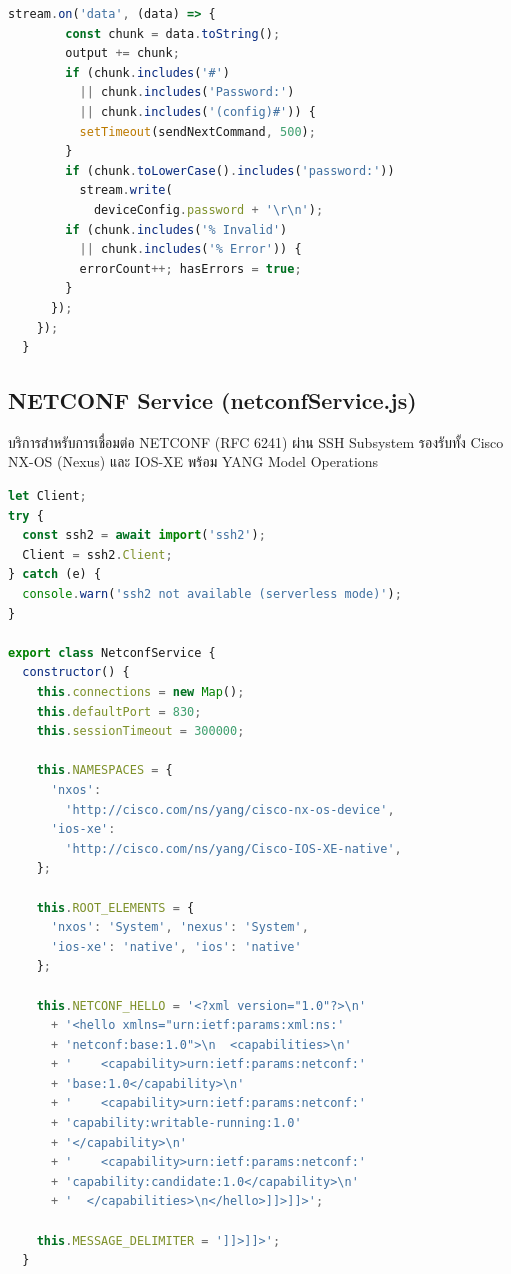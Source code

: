 \begin{lstlisting}[language=JavaScript, caption={sshService.js -- sendConfigCommands (Deploy Configuration)}]
      stream.on('data', (data) => {
        const chunk = data.toString();
        output += chunk;
        if (chunk.includes('#')
          || chunk.includes('Password:')
          || chunk.includes('(config)#')) {
          setTimeout(sendNextCommand, 500);
        }
        if (chunk.toLowerCase().includes('password:'))
          stream.write(
            deviceConfig.password + '\r\n');
        if (chunk.includes('% Invalid')
          || chunk.includes('% Error')) {
          errorCount++; hasErrors = true;
        }
      });
    });
  }
\end{lstlisting}

\subsection{NETCONF Service (netconfService.js)}
\hspace*{1.3em}
บริการสำหรับการเชื่อมต่อ NETCONF (RFC 6241) ผ่าน SSH Subsystem รองรับทั้ง Cisco NX-OS (Nexus) และ IOS-XE พร้อม YANG Model Operations

\begin{lstlisting}[language=JavaScript, caption={services/netconfService.js -- NETCONF Service Class}]
let Client;
try {
  const ssh2 = await import('ssh2');
  Client = ssh2.Client;
} catch (e) {
  console.warn('ssh2 not available (serverless mode)');
}

export class NetconfService {
  constructor() {
    this.connections = new Map();
    this.defaultPort = 830;
    this.sessionTimeout = 300000;

    this.NAMESPACES = {
      'nxos':
        'http://cisco.com/ns/yang/cisco-nx-os-device',
      'ios-xe':
        'http://cisco.com/ns/yang/Cisco-IOS-XE-native',
    };

    this.ROOT_ELEMENTS = {
      'nxos': 'System', 'nexus': 'System',
      'ios-xe': 'native', 'ios': 'native'
    };

    this.NETCONF_HELLO = '<?xml version="1.0"?>\n'
      + '<hello xmlns="urn:ietf:params:xml:ns:'
      + 'netconf:base:1.0">\n  <capabilities>\n'
      + '    <capability>urn:ietf:params:netconf:'
      + 'base:1.0</capability>\n'
      + '    <capability>urn:ietf:params:netconf:'
      + 'capability:writable-running:1.0'
      + '</capability>\n'
      + '    <capability>urn:ietf:params:netconf:'
      + 'capability:candidate:1.0</capability>\n'
      + '  </capabilities>\n</hello>]]>]]>';

    this.MESSAGE_DELIMITER = ']]>]]>';
  }
\end{lstlisting}

